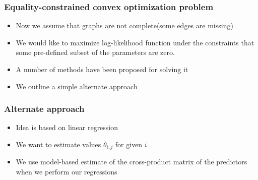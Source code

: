 \documentclass{beamer}
\begin{document}
\begin{frame}
\frametitle{Equality-constrained convex optimization problem}
\begin{itemize}
\item Now we assume that graphs are not complete(some edges are missing)
\item We would like to maximize log-likelihood function under the constraints that some pre-defined subset of the parameters are zero.
\item A number of methods have been proposed for solving it
\item We outline a simple alternate approach 
\end{itemize}
\end{frame}

\begin{frame}
\frametitle{Alternate approach}
\begin{itemize}
\item Idea is based on linear regression
\item We want to estimate values $\theta_{i,j}$ for given $i$
\item We use model-based estimate of the cross-product matrix of the predictors when we perform our regressions
\end{itemize}
\end{frame}
\end{document}
